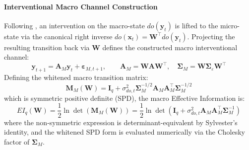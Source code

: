 \documentclass[review,12pt,authoryear]{elsarticle}
\begin{document}
\paragraph{Interventional Macro Channel Construction}
Following \citet{liu2024exact}, an intervention on the macro-state $do(\mathbf{y}_t)$ is lifted to the micro-state via the canonical right inverse $do(\mathbf{x}_t) = \mathbf{W}^\top do(\mathbf{y}_t)$. Projecting the resulting transition back via $\mathbf{W}$ defines the constructed macro interventional channel:
\begin{equation}
\mathbf{y}_{t+1} = \mathbf{A}_M \mathbf{y}_t + \boldsymbol{\varepsilon}_{M, t+1}, \qquad \mathbf{A}_M = \mathbf{W}\mathbf{A}\mathbf{W}^\top, \quad \boldsymbol{\Sigma}_M = \mathbf{W}\boldsymbol{\Sigma}_\varepsilon \mathbf{W}^\top
\label{eq:macro_dynamics_def}
\end{equation}
Defining the whitened macro transition matrix:
\begin{equation}
\mathbf{M}_M(\mathbf{W}) = \mathbf{I}_q + \sigma_{do,t}^2 \boldsymbol{\Sigma}_M^{-1/2} \mathbf{A}_M \mathbf{A}_M^\top \boldsymbol{\Sigma}_M^{-1/2}
\label{eq:m_macro_spd}
\end{equation}
which is symmetric positive definite (SPD), the macro Effective Information is:
\begin{equation}
EI_q(\mathbf{W}) = \frac{1}{2} \ln \det\left( \mathbf{M}_M(\mathbf{W}) \right) = \frac{1}{2} \ln \det\left( \mathbf{I}_q + \sigma_{do,t}^2 \mathbf{A}_M \mathbf{A}_M^\top \boldsymbol{\Sigma}_M^{-1} \right)
\label{eq:ei_macro_closed}
\end{equation}
where the non-symmetric expression is determinant-equivalent by Sylvester's identity, and the whitened SPD form is evaluated numerically via the Cholesky factor of $\boldsymbol{\Sigma}_M$.
\end{document}
